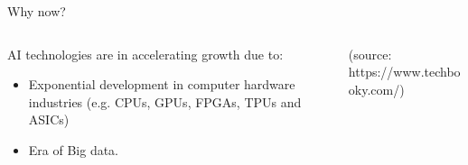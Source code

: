 \documentclass[10pt,aspectratio=169,dvipsnames]{beamer} %
\begin{document}
	\setcounter{subfigure}{0}
	\begin{frame}{Why now?}
		\begin{columns}[T]
			\begin{column}[c]{0.4\textwidth}
				AI technologies are in accelerating growth due to:
				\begin{itemize}
					\item Exponential development in computer hardware industries
					(e.g. CPUs, GPUs, FPGAs, TPUs and ASICs)
					\item Era of Big data.
				\end{itemize}
			\end{column}
			\begin{column}[c]{0.55\textwidth}
				\begin{figure}
					\centering
				\end{figure}
				\tiny
				(source: https://www.techbooky.com/)
			\end{column}
		\end{columns}		
	\end{frame}
\end{document}
